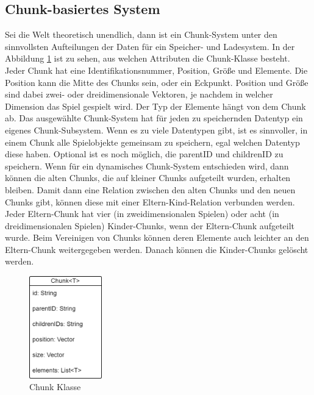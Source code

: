 \subsection{Chunk-basiertes System}
Sei die Welt theoretisch unendlich, dann ist ein Chunk-System unter den sinnvollsten Aufteilungen der Daten für ein Speicher- und Ladesystem. In der Abbildung \ref{fig:chunkClass} ist zu sehen, aus welchen Attributen die Chunk-Klasse besteht. Jeder Chunk hat eine Identifikationsnummer, Position, Größe und Elemente. Die Position kann die Mitte des Chunks sein, oder ein Eckpunkt. Position und Größe sind dabei zwei- oder dreidimensionale Vektoren, je nachdem in welcher Dimension das Spiel gespielt wird. Der Typ der Elemente hängt von dem Chunk ab. Das ausgewählte Chunk-System hat für jeden zu speichernden Datentyp ein eigenes Chunk-Subsystem. Wenn es zu viele Datentypen gibt, ist es sinnvoller, in einem Chunk alle Spielobjekte gemeinsam zu speichern, egal welchen Datentyp diese haben. Optional ist es noch möglich, die parentID und childrenID zu speichern. Wenn für ein dynamisches Chunk-System entschieden wird, dann können die alten Chunks, die auf kleiner Chunks aufgeteilt wurden, erhalten bleiben. Damit dann eine Relation zwischen den alten Chunks und den neuen Chunks gibt, können diese mit einer Eltern-Kind-Relation verbunden werden. Jeder Eltern-Chunk hat vier (in zweidimensionalen Spielen) oder acht (in dreidimensionalen Spielen) Kinder-Chunks, wenn der Eltern-Chunk aufgeteilt wurde. Beim Vereinigen von Chunks können deren Elemente auch leichter an den Eltern-Chunk weitergegeben werden. Danach können die Kinder-Chunks gelöscht werden.

\begin{figure}[htp]
    \centering
    \includegraphics[width=0.28\textwidth]{images/Chunk.png}
    \caption{Chunk Klasse}
    \label{fig:chunkClass}
\end{figure}


